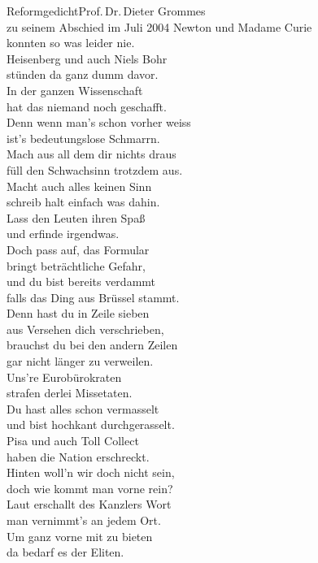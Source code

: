 \begin{lied*}{Reformgedicht}{Prof.\,Dr.\,Dieter Grommes\\zu seinem Abschied im Juli 2004}
Newton und Madame Curie\\
konnten so was leider nie.\\
Heisenberg und auch Niels Bohr\\
stünden da ganz dumm davor.\\
In der ganzen Wissenschaft\\
hat das niemand noch geschafft.\\
Denn wenn man's schon vorher weiss\\
ist's bedeutungslose Schmarrn.\\

Mach aus all dem dir nichts draus\\
füll den Schwachsinn trotzdem aus.\\
Macht auch alles keinen Sinn\\
schreib halt einfach was dahin.\\
Lass den Leuten ihren Spaß\\
und erfinde irgendwas.\\

Doch pass auf, das Formular\\
bringt beträchtliche Gefahr,\\
und du bist bereits verdammt\\
falls das Ding aus Brüssel stammt.\\
Denn hast du in Zeile sieben\\
aus Versehen dich verschrieben,\\
brauchst du bei den andern Zeilen\\
gar nicht länger zu verweilen.\\
Uns're Eurobürokraten\\
strafen derlei Missetaten.\\
Du hast alles schon vermasselt\\
und bist hochkant durchgerasselt.\\

Pisa und auch Toll Collect\\
haben die Nation erschreckt.\\
Hinten woll'n wir doch nicht sein,\\
doch wie kommt man vorne rein?\\

Laut erschallt des Kanzlers Wort\\
man vernimmt's an jedem Ort.\\
Um ganz vorne mit zu bieten\\
da bedarf es der Eliten.\\


\end{lied*}
